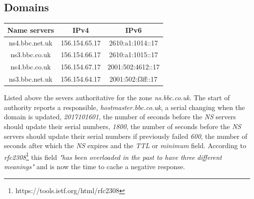 \documentclass[conference]{IEEEtran}
\begin{document}

\subsection{Domains} 
\begin{table}[h!]
     \centering
     \begin{tabular}{|c|c|c|}
        \hline
        
         Name servers & IPv4 & IPv6 
    \\
        \hline
        ns4.bbc.net.uk & 156.154.65.17 & 2610:a1:1014::17 \\
        ns3.bbc.co.uk & 156.154.66.17 & 2610:a1:1015::17 \\
        ns4.bbc.co.uk & 156.154.67.17 & 2001:502:4612::17 \\
        ns3.bbc.net.uk & 156.154.64.17 & 2001:502:f3ff::17 \\
        \hline
    \end{tabular}
     \label{tab:my_label}
 \end{table}
 Listed above the severs authoritative for the zone \textit{ns.bbc.co.uk}. The start of authority reports a responsible, \textit{hostmaster.bbc.co.uk}, a serial changing when the domain is updated, \textit{2017101601}, the number of seconds before the \textit{NS} servers should update their serial numbers, \textit{1800},  the number of seconds before the \textit{NS} servers should update their serial numbers if previously failed \textit{600}, the number of seconds after which the \textit{NS} expires and the \textit{TTL} or \textit{minimum} field. According to \textit{rfc2308}\footnote{https://tools.ietf.org/html/rfc2308} this field \textit{"has been overloaded in the past to have three
   different meanings"} and is now the time to cache a negative response.
\end{document}
